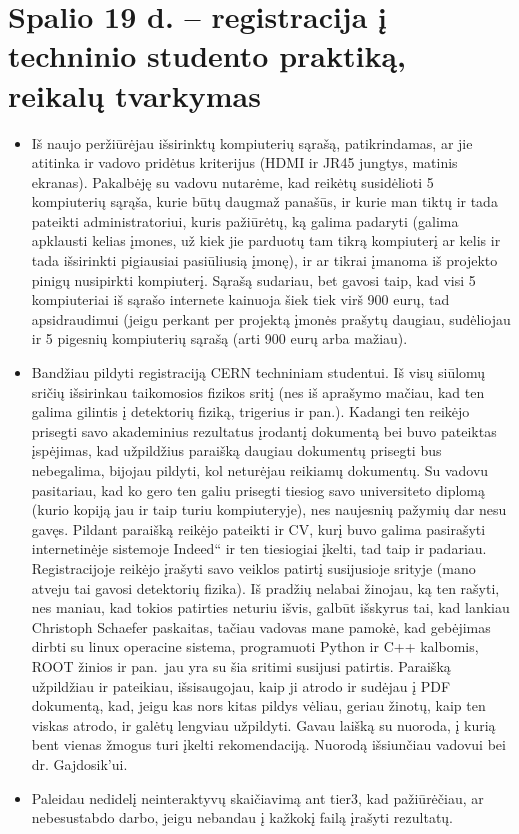 \documentclass[a4paper, 12pt]{article}
\newcommand{\ltq}[1]{{\quotedblbase{}#1\textquotedblleft{}}}
\begin{document}
\section{Spalio 19 d. -- registracija į techninio studento praktiką, reikalų tvarkymas}
\begin{itemize}
	\item Iš naujo peržiūrėjau išsirinktų kompiuterių sąrašą, patikrindamas,
	ar jie atitinka ir vadovo pridėtus kriterijus (HDMI ir JR45 jungtys, matinis
	ekranas). Pakalbėję su vadovu nutarėme, kad reikėtų susidėlioti 5 kompiuterių
	sąrąša, kurie būtų daugmaž panašūs, ir kurie man tiktų ir tada pateikti
	administratoriui, kuris pažiūrėtų, ką galima padaryti (galima apklausti kelias
	įmones, už kiek jie parduotų tam tikrą kompiuterį ar kelis ir tada išsirinkti
	pigiausiai pasiūliusią įmonę), ir ar tikrai įmanoma iš projekto pinigų nusipirkti
	kompiuterį. Sąrašą sudariau, bet gavosi taip, kad visi 5 kompiuteriai iš sąrašo
	internete kainuoja šiek tiek virš 900 eurų, tad apsidraudimui (jeigu perkant per
	projektą įmonės prašytų daugiau, sudėliojau ir 5 pigesnių kompiuterių sąrašą
	(arti 900 eurų arba mažiau).
	\item Bandžiau pildyti registraciją CERN techniniam studentui. Iš visų siūlomų
	sričių išsirinkau taikomosios fizikos sritį (nes iš aprašymo mačiau, kad ten
	galima gilintis į detektorių fiziką, trigerius ir pan.). Kadangi ten reikėjo
	prisegti savo akademinius rezultatus įrodantį dokumentą bei buvo pateiktas
	įspėjimas, kad užpildžius paraišką daugiau dokumentų prisegti bus nebegalima,
	bijojau pildyti, kol neturėjau reikiamų dokumentų. Su vadovu pasitariau, kad
	ko gero ten galiu prisegti tiesiog savo universiteto diplomą (kurio kopiją jau
	ir taip turiu kompiuteryje), nes naujesnių pažymių dar nesu gavęs. Pildant
	paraišką reikėjo pateikti ir CV, kurį buvo galima pasirašyti internetinėje
	sistemoje \ltq{Indeed} ir ten tiesiogiai įkelti, tad taip ir padariau.
	Registracijoje reikėjo įrašyti savo veiklos patirtį susijusioje srityje (mano
	atveju tai gavosi detektorių fizika). Iš pradžių nelabai žinojau, ką ten rašyti,
	nes maniau, kad tokios patirties neturiu išvis, galbūt išskyrus tai, kad lankiau
	Christoph Schaefer paskaitas, tačiau vadovas mane pamokė, kad gebėjimas dirbti
	su linux operacine sistema, programuoti Python ir C++ kalbomis, ROOT žinios ir
	pan.\ jau yra su šia sritimi susijusi patirtis. Paraišką užpildžiau ir pateikiau,
	išsisaugojau, kaip ji atrodo ir sudėjau į PDF dokumentą, kad, jeigu kas nors
	kitas pildys vėliau, geriau žinotų, kaip ten viskas atrodo, ir galėtų lengviau
	užpildyti. Gavau laišką su nuoroda, į kurią bent vienas žmogus turi įkelti
	rekomendaciją. Nuorodą išsiunčiau vadovui bei dr. Gajdosik'ui.
	\item Paleidau nedidelį neinteraktyvų skaičiavimą ant tier3, kad pažiūrėčiau,
	ar nebesustabdo darbo, jeigu nebandau į kažkokį failą įrašyti rezultatų.
	

\end{itemize}
\end{document}
